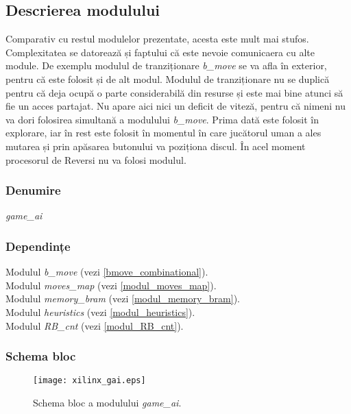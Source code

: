 \documentclass[12pt,twoside,a4paper,fleqn]{book}
\theoremstyle{definition}
\begin{document}
\subsection{Descrierea modulului}
Comparativ cu restul modulelor prezentate, acesta este mult mai stufos. Complexitatea se datorează și faptului că este nevoie comunicaera cu alte module. De exemplu modulul de tranziționare \emph{b\_move} se va afla în exterior, pentru că este folosit și de alt modul. Modulul de tranziționare nu se duplică pentru că deja ocupă o parte considerabilă din resurse și este mai bine atunci să fie un acces partajat. Nu apare aici nici un deficit de viteză, pentru că nimeni nu va dori folosirea simultană a modulului \emph{b\_move}. Prima dată este folosit în explorare, iar în rest este folosit în momentul în care jucătorul uman a ales mutarea și prin apăsarea butonului va poziționa discul. În acel moment procesorul de Reversi nu va folosi modulul.
\subsubsection{Denumire}
\emph{game\_ai}
\subsubsection{Dependințe}
Modulul \emph{b\_move} (vezi \ref{bmove_combinational}).\\
Modulul \emph{moves\_map} (vezi \ref{modul_moves_map}).\\
Modulul \emph{memory\_bram} (vezi \ref{modul_memory_bram}).\\
Modulul \emph{heuristics} (vezi \ref{modul_heuristics}).\\
Modulul \emph{RB\_cnt} (vezi \ref{modul_RB_cnt}).

\subsubsection{Schema bloc}
\begin{figure}[h]
\texttt{[image: xilinx\_gai.eps]}
\caption{\small{Schema bloc a modulului \emph{game\_ai}.}}
\label{fig:fig_gameai}
\end{figure}
\end{document}

